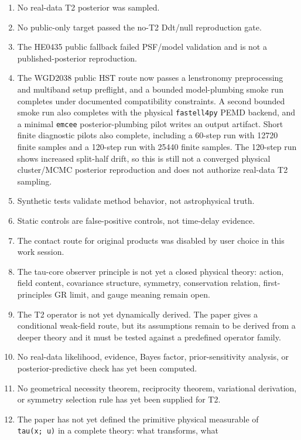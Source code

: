 \documentclass[11pt]{article}
\providecommand{\tightlist}{%
  \setlength{\itemsep}{0pt}\setlength{\parskip}{0pt}}
\begin{document}
\begin{enumerate}
\def\labelenumi{\arabic{enumi}.}
\tightlist
\item
  No real-data T2 posterior was sampled.
\item
  No public-only target passed the no-T2 Ddt/null reproduction gate.
\item
  The HE0435 public fallback failed PSF/model validation and is not a
  published-posterior reproduction.
\item
  The WGD2038 public HST route now passes a lenstronomy preprocessing
  and multiband setup preflight, and a bounded model-plumbing smoke run
  completes under documented compatibility constraints. A second bounded
  smoke run also completes with the physical \texttt{fastell4py} PEMD
  backend, and a minimal \texttt{emcee} posterior-plumbing pilot writes an
  output artifact. Short finite diagnostic pilots also complete, including a
  60-step run with 12720 finite samples and a 120-step run with 25440 finite
  samples. The 120-step run shows increased split-half drift, so this is still
  not a converged physical cluster/MCMC posterior reproduction and does not
  authorize real-data T2 sampling.
\item
  Synthetic tests validate method behavior, not astrophysical truth.
\item
  Static controls are false-positive controls, not time-delay evidence.
\item
  The contact route for original products was disabled by user choice in
  this work session.
\item
  The tau-core observer principle is not yet a closed physical theory:
  action, field content, covariance structure, symmetry, conservation
  relation, first-principles GR limit, and gauge meaning remain open.
\item
  The T2 operator is not yet dynamically derived. The paper gives a
  conditional weak-field route, but its assumptions remain to be derived
  from a deeper theory and it must be tested against a predefined
  operator family.
\item
  No real-data likelihood, evidence, Bayes factor, prior-sensitivity
  analysis, or posterior-predictive check has yet been computed.
\item
  No geometrical necessity theorem, reciprocity theorem, variational
  derivation, or symmetry selection rule has yet been supplied for T2.
\item
  The paper has not yet defined the primitive physical measurable of
  \texttt{tau(x;\ u)} in a complete theory: what transforms, what

\end{enumerate}
\end{document}
